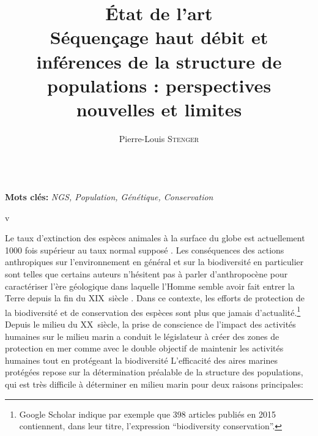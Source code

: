 \documentclass[a4paper,12pt,twoside]{article}\usepackage[]{graphicx}\usepackage[]{color}
\begin{document}
\newpage

\title{{\Huge État de l'art}\\[3pc]Séquençage haut débit et inférences de la structure de populations : perspectives nouvelles et limites}
\author{Pierre-Louis \textsc{Stenger}}
\date{}
\frontmatter

\maketitle 






~~\\
\textbf{Mots clés:} \emph{NGS, Population, Génétique, Conservation}
~~\\

\newpage

\listoffigures  %
\listoftables   %

\mainmatter

v
 \setcounter{page}{1} 


Le taux d'extinction des espèces animales à la surface du globe est actuellement 1000 fois supérieur au taux normal supposé \citep{pimm2014aa}. Les conséquences des actions anthropiques sur l'environnement en général et sur la biodiversité en particulier sont telles que certains auteurs n'hésitent pas à parler d'anthropocène pour caractériser l'ère géologique dans laquelle l'Homme semble avoir fait entrer la Terre depuis la fin du XIX\ieme{}~siècle \citep{crutzen23ff}. Dans ce contexte, les efforts de protection de la biodiversité et de conservation des espèces sont plus que jamais d'actualité.\footnote{Google Scholar indique par exemple que 398 articles publiés en 2015 contiennent, dans leur titre, l'expression ``biodiversity conservation''.} Depuis le milieu du XX\ieme{}~siècle, la prise de conscience de l'impact des activités humaines sur le milieu marin a conduit le législateur à créer des zones de protection en mer comme avec le double objectif de maintenir les activités humaines tout en protégeant la biodiversité \citep{frost2016} L'efficacité des aires marines protégées repose sur la détermination préalable de la structure des populations, qui est très difficile à déterminer en milieu marin \citep{Jonsson2016} pour deux raisons principales:
\end{document}

